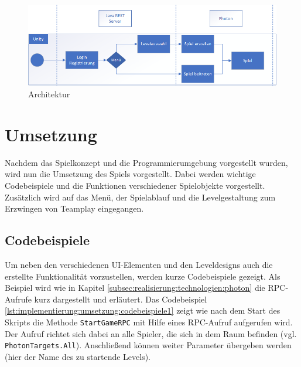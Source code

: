 \begin{figure}[H]
    \begin{center}
      \includegraphics[width=\linewidth]{img/realisierung/Architektur}
      \caption{Architektur}
      \label{fig:realisierung:technologien:architektur}
    \end{center}
\end{figure}


\section{Umsetzung}
\label{sec:grundlagen:umsetzung}
Nachdem das Spielkonzept und die Programmierumgebung vorgestellt wurden, wird nun die Umsetzung des Spiels vorgestellt. Dabei werden wichtige Codebeispiele und die Funktionen verschiedener Spielobjekte vorgestellt. Zusätzlich wird auf das Menü, der Spielablauf und die Levelgestaltung zum Erzwingen von Teamplay eingegangen.

\subsection{Codebeispiele}
\label{subsec:implementierung:umsetzung:codebeispiele}
Um neben den verschiedenen UI-Elementen und den Leveldesigns auch die erstellte Funktionalität vorzustellen, werden kurze Codebeispiele gezeigt. Als Beispiel wird wie in Kapitel \ref{subsec:realisierung:technologien:photon} die RPC-Aufrufe kurz dargestellt und erläutert. Das Codebeispiel \ref{lst:implementierung:umsetzung:codebeispiele1} zeigt wie nach dem Start des Skripts die Methode \texttt{StartGameRPC} mit Hilfe eines RPC-Aufruf aufgerufen wird. Der Aufruf richtet sich dabei an alle Spieler, die sich in dem Raum befinden (vgl. \texttt{PhotonTargets.All}). Anschließend können weiter Parameter übergeben werden (hier der Name des zu startende Levels).

